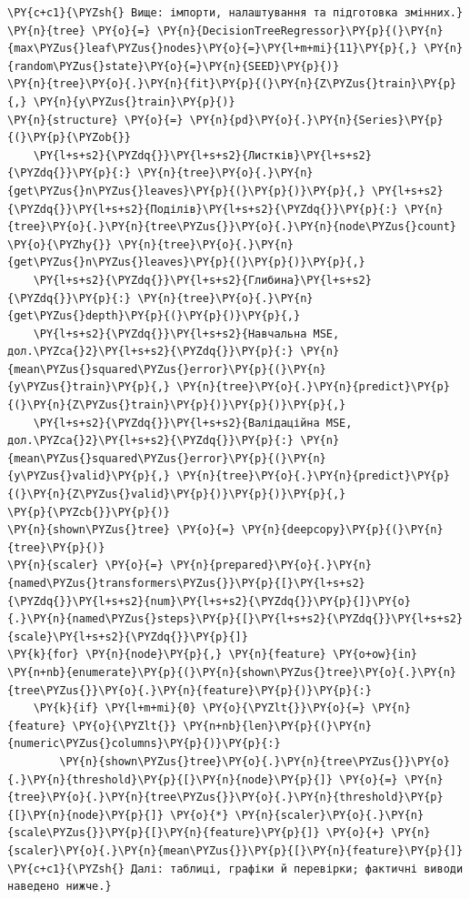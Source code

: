 \begin{Verbatim}[commandchars=\\\{\}]
\PY{c+c1}{\PYZsh{} Вище: імпорти, налаштування та підготовка змінних.}
\PY{n}{tree} \PY{o}{=} \PY{n}{DecisionTreeRegressor}\PY{p}{(}\PY{n}{max\PYZus{}leaf\PYZus{}nodes}\PY{o}{=}\PY{l+m+mi}{11}\PY{p}{,} \PY{n}{random\PYZus{}state}\PY{o}{=}\PY{n}{SEED}\PY{p}{)}
\PY{n}{tree}\PY{o}{.}\PY{n}{fit}\PY{p}{(}\PY{n}{Z\PYZus{}train}\PY{p}{,} \PY{n}{y\PYZus{}train}\PY{p}{)}
\PY{n}{structure} \PY{o}{=} \PY{n}{pd}\PY{o}{.}\PY{n}{Series}\PY{p}{(}\PY{p}{\PYZob{}}
    \PY{l+s+s2}{\PYZdq{}}\PY{l+s+s2}{Листків}\PY{l+s+s2}{\PYZdq{}}\PY{p}{:} \PY{n}{tree}\PY{o}{.}\PY{n}{get\PYZus{}n\PYZus{}leaves}\PY{p}{(}\PY{p}{)}\PY{p}{,} \PY{l+s+s2}{\PYZdq{}}\PY{l+s+s2}{Поділів}\PY{l+s+s2}{\PYZdq{}}\PY{p}{:} \PY{n}{tree}\PY{o}{.}\PY{n}{tree\PYZus{}}\PY{o}{.}\PY{n}{node\PYZus{}count} \PY{o}{\PYZhy{}} \PY{n}{tree}\PY{o}{.}\PY{n}{get\PYZus{}n\PYZus{}leaves}\PY{p}{(}\PY{p}{)}\PY{p}{,}
    \PY{l+s+s2}{\PYZdq{}}\PY{l+s+s2}{Глибина}\PY{l+s+s2}{\PYZdq{}}\PY{p}{:} \PY{n}{tree}\PY{o}{.}\PY{n}{get\PYZus{}depth}\PY{p}{(}\PY{p}{)}\PY{p}{,}
    \PY{l+s+s2}{\PYZdq{}}\PY{l+s+s2}{Навчальна MSE, дол.\PYZca{}2}\PY{l+s+s2}{\PYZdq{}}\PY{p}{:} \PY{n}{mean\PYZus{}squared\PYZus{}error}\PY{p}{(}\PY{n}{y\PYZus{}train}\PY{p}{,} \PY{n}{tree}\PY{o}{.}\PY{n}{predict}\PY{p}{(}\PY{n}{Z\PYZus{}train}\PY{p}{)}\PY{p}{)}\PY{p}{,}
    \PY{l+s+s2}{\PYZdq{}}\PY{l+s+s2}{Валідаційна MSE, дол.\PYZca{}2}\PY{l+s+s2}{\PYZdq{}}\PY{p}{:} \PY{n}{mean\PYZus{}squared\PYZus{}error}\PY{p}{(}\PY{n}{y\PYZus{}valid}\PY{p}{,} \PY{n}{tree}\PY{o}{.}\PY{n}{predict}\PY{p}{(}\PY{n}{Z\PYZus{}valid}\PY{p}{)}\PY{p}{)}\PY{p}{,}
\PY{p}{\PYZcb{}}\PY{p}{)}
\PY{n}{shown\PYZus{}tree} \PY{o}{=} \PY{n}{deepcopy}\PY{p}{(}\PY{n}{tree}\PY{p}{)}
\PY{n}{scaler} \PY{o}{=} \PY{n}{prepared}\PY{o}{.}\PY{n}{named\PYZus{}transformers\PYZus{}}\PY{p}{[}\PY{l+s+s2}{\PYZdq{}}\PY{l+s+s2}{num}\PY{l+s+s2}{\PYZdq{}}\PY{p}{]}\PY{o}{.}\PY{n}{named\PYZus{}steps}\PY{p}{[}\PY{l+s+s2}{\PYZdq{}}\PY{l+s+s2}{scale}\PY{l+s+s2}{\PYZdq{}}\PY{p}{]}
\PY{k}{for} \PY{n}{node}\PY{p}{,} \PY{n}{feature} \PY{o+ow}{in} \PY{n+nb}{enumerate}\PY{p}{(}\PY{n}{shown\PYZus{}tree}\PY{o}{.}\PY{n}{tree\PYZus{}}\PY{o}{.}\PY{n}{feature}\PY{p}{)}\PY{p}{:}
    \PY{k}{if} \PY{l+m+mi}{0} \PY{o}{\PYZlt{}}\PY{o}{=} \PY{n}{feature} \PY{o}{\PYZlt{}} \PY{n+nb}{len}\PY{p}{(}\PY{n}{numeric\PYZus{}columns}\PY{p}{)}\PY{p}{:}
        \PY{n}{shown\PYZus{}tree}\PY{o}{.}\PY{n}{tree\PYZus{}}\PY{o}{.}\PY{n}{threshold}\PY{p}{[}\PY{n}{node}\PY{p}{]} \PY{o}{=} \PY{n}{tree}\PY{o}{.}\PY{n}{tree\PYZus{}}\PY{o}{.}\PY{n}{threshold}\PY{p}{[}\PY{n}{node}\PY{p}{]} \PY{o}{*} \PY{n}{scaler}\PY{o}{.}\PY{n}{scale\PYZus{}}\PY{p}{[}\PY{n}{feature}\PY{p}{]} \PY{o}{+} \PY{n}{scaler}\PY{o}{.}\PY{n}{mean\PYZus{}}\PY{p}{[}\PY{n}{feature}\PY{p}{]}
\PY{c+c1}{\PYZsh{} Далі: таблиці, графіки й перевірки; фактичні виводи наведено нижче.}
\end{Verbatim}
